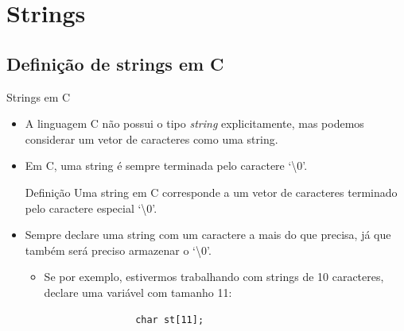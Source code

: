 \documentclass[handout]{beamer}
\begin{document}

\section{Strings}


\subsection{Definição de strings em C}

\begin{frame}[fragile]{Strings em C}

    \begin{itemize}[<+->]
        \item A linguagem C não possui o tipo {\it string} explicitamente, mas podemos considerar um vetor de caracteres como uma string.
        \item Em C, uma string é sempre terminada pelo caractere `\textbackslash0'.

        \begin{block}{Definição}
            Uma string em C corresponde a um vetor de caracteres terminado pelo caractere especial `\textbackslash0'.
        \end{block}

        \item Sempre declare uma string com um caractere a mais do que precisa, já que também será preciso armazenar o `\textbackslash0'.
        \begin{itemize}
            \item Se por exemplo, estivermos trabalhando com strings de 10 caracteres, declare uma variável com tamanho 11:
            \begin{verbatim}
                char st[11];
            \end{verbatim}
        \end{itemize}
    \end{itemize}

\end{frame}
\end{document}
